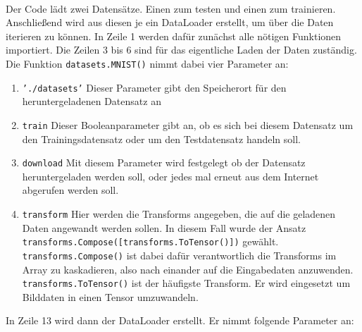 \documentclass[11pt]{article}
\begin{document}
\\
Der Code lädt zwei Datensätze. Einen zum testen und einen zum trainieren. Anschließend wird aus diesen je ein DataLoader erstellt, um über die Daten iterieren zu können. In Zeile 1 werden dafür zunächst alle nötigen Funktionen importiert. Die Zeilen 3 bis 6 sind für das eigentliche Laden der Daten zuständig. \\
Die Funktion \texttt{datasets.MNIST()} nimmt dabei vier Parameter an:
\begin{enumerate}
	\item \texttt{'./datasets'} Dieser Parameter gibt den Speicherort für den heruntergeladenen Datensatz an
	\item \texttt{train} Dieser Booleanparameter gibt an, ob es sich bei diesem Datensatz um den Trainingsdatensatz oder um den Testdatensatz handeln soll.
	\item \texttt{download} Mit diesem Parameter wird festgelegt ob der Datensatz heruntergeladen werden soll, oder jedes mal erneut aus dem Internet abgerufen werden soll.
	\item \texttt{transform} Hier werden die Transforms angegeben, die auf die geladenen Daten angewandt werden sollen. In diesem Fall wurde der Ansatz\\ \texttt{transforms.Compose([transforms.ToTensor()])} gewählt.\\ \texttt{transforms.Compose()} ist dabei dafür verantwortlich die Transforms im Array zu kaskadieren, also nach einander auf die Eingabedaten anzuwenden. \\
	\texttt{transforms.ToTensor()} ist der häufigste Transform. Er wird eingesetzt um Bilddaten in einen Tensor umzuwandeln.
\end{enumerate}
In Zeile 13 wird dann der DataLoader erstellt. Er nimmt folgende Parameter an:
\end{document}
